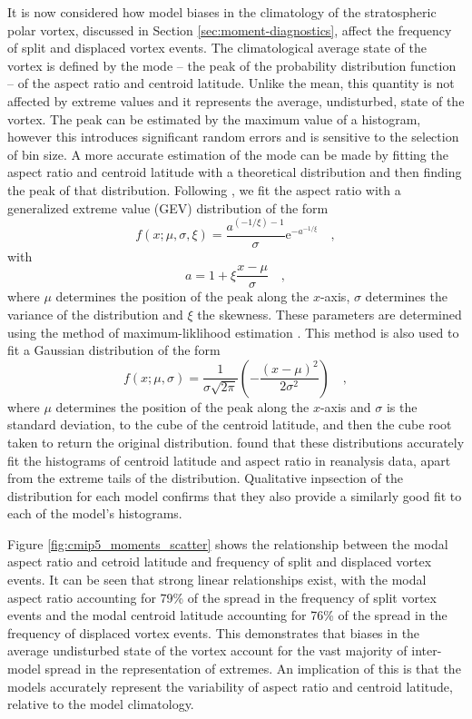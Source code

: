 \bigskip It is now considered how model biases in the climatology of the
stratospheric polar vortex, discussed in Section \ref{sec:moment-diagnostics},
affect the frequency of split and displaced vortex events. The climatological
average state of the vortex is defined by the mode -- the peak of the
probability distribution function -- of the aspect ratio and centroid
latitude. Unlike the mean, this quantity is not affected by extreme values and
it represents the average, undisturbed, state of the vortex. The peak can be
estimated by the maximum value of a histogram, however this introduces
significant random errors and is sensitive to the selection of bin size. A more
accurate estimation of the mode can be made by fitting the aspect ratio and
centroid latitude with a theoretical distribution and then finding the peak of
that distribution. Following \citet{Mitchell2011}, we fit the aspect ratio with
a generalized extreme value (GEV) distribution of the form
\begin{equation}
f(x;\mu,\sigma,\xi) = \frac{a^{(-1/\xi)-1}}{\sigma}\mathrm{e}^{{-a}^{-1/\xi}}
\quad , 
\end{equation}
with
\begin{equation} 
a = 1 + \xi \frac{x-\mu}{\sigma} \quad ,
\end{equation}
where $\mu$ determines the position of the peak along the $x$-axis, $\sigma$
determines the variance of the distribution and $\xi$ the skewness. These
parameters are determined using the method of maximum-liklihood estimation
\citep{Wilks}. This method is also used to fit a Gaussian distribution of the
form
\begin{equation}
f(x;\mu,\sigma) = \frac{1}{\sigma\sqrt{2\pi}} \left(
  -\frac{(x-\mu)^2}{2\sigma^{2}} \right) \quad ,
\end{equation}
where $\mu$ determines the position of the peak along the $x$-axis and $\sigma$
is the standard deviation, to the cube of the centroid latitude, and then the
cube root taken to return the original distribution. \citet{Mitchell2011} found
that these distributions accurately fit the histograms of centroid latitude and
aspect ratio in reanalysis data, apart from the extreme tails of the
distribution. Qualitative inpsection of the distribution for each model confirms
that they also provide a similarly good fit to each of the model's histograms.

Figure \ref{fig:cmip5_moments_scatter} shows the relationship between the modal
aspect ratio and cetroid latitude and frequency of split and displaced vortex
events. It can be seen that strong linear relationships exist, with the modal
aspect ratio accounting for 79\% of the spread in the frequency of split vortex
events and the modal centroid latitude accounting for 76\% of the spread in the
frequency of displaced vortex events. This demonstrates that biases in the
average undisturbed state of the vortex account for the vast majority of
inter-model spread in the representation of extremes. An implication of this is
that the models accurately represent the variability of aspect ratio and
centroid latitude, relative to the model climatology. 

